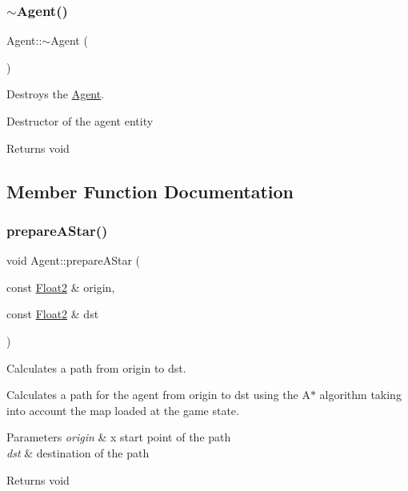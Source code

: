 \subsubsection{\texorpdfstring{$\sim$\+Agent()}{~Agent()}}
{\footnotesize\ttfamily Agent\+::$\sim$\+Agent (\begin{DoxyParamCaption}{ }\end{DoxyParamCaption})}



Destroys the \mbox{\hyperlink{class_agent}{Agent}}. 

Destructor of the agent entity

\begin{DoxyReturn}{Returns}
void 
\end{DoxyReturn}


\subsection{Member Function Documentation}
\mbox{\label{class_agent_a6c15063ebfaaf37ba467f2086849dd9d}} 
\subsubsection{\texorpdfstring{prepare\+A\+Star()}{prepareAStar()}}
{\footnotesize\ttfamily void Agent\+::prepare\+A\+Star (\begin{DoxyParamCaption}\item[{const \mbox{\hyperlink{class_float2}{Float2}} \&}]{origin,  }\item[{const \mbox{\hyperlink{class_float2}{Float2}} \&}]{dst }\end{DoxyParamCaption})}



Calculates a path from origin to dst. 

Calculates a path for the agent from origin to dst using the A$\ast$ algorithm taking into account the map loaded at the game state.


\begin{DoxyParams}{Parameters}
{\em origin} & x start point of the path \\
\hline
{\em dst} & destination of the path \\
\hline
\end{DoxyParams}
\begin{DoxyReturn}{Returns}
void 
\end{DoxyReturn}
\mbox{\label{class_agent_aa5429086a4b2f6b954aa914f97d92366}} 
